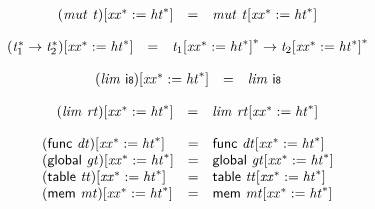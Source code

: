 $$
\begin{array}{@{}lcl@{}l@{}}
{({\mathit{mut}}~{\mathit{t}})}{{}[{{\mathit{xx}}^\ast} := {{\mathit{ht}}^\ast}]} &=& {\mathit{mut}}~{{\mathit{t}}}{{}[{{\mathit{xx}}^\ast} := {{\mathit{ht}}^\ast}]} &  \\
\end{array}
$$

$$
\begin{array}{@{}lcl@{}l@{}}
{({{\mathit{t}}_{{1}}^\ast} \rightarrow {{\mathit{t}}_{{2}}^\ast})}{{}[{{\mathit{xx}}^\ast} := {{\mathit{ht}}^\ast}]} &=& {{{\mathit{t}}_{{1}}}{{}[{{\mathit{xx}}^\ast} := {{\mathit{ht}}^\ast}]}^\ast} \rightarrow {{{\mathit{t}}_{{2}}}{{}[{{\mathit{xx}}^\ast} := {{\mathit{ht}}^\ast}]}^\ast} &  \\
\end{array}
$$

$$
\begin{array}{@{}lcl@{}l@{}}
{({\mathit{lim}}~\mathsf{i{\scriptstyle8}})}{{}[{{\mathit{xx}}^\ast} := {{\mathit{ht}}^\ast}]} &=& {\mathit{lim}}~\mathsf{i{\scriptstyle8}} &  \\
\end{array}
$$

$$
\begin{array}{@{}lcl@{}l@{}}
{({\mathit{lim}}~{\mathit{rt}})}{{}[{{\mathit{xx}}^\ast} := {{\mathit{ht}}^\ast}]} &=& {\mathit{lim}}~{{\mathit{rt}}}{{}[{{\mathit{xx}}^\ast} := {{\mathit{ht}}^\ast}]} &  \\
\end{array}
$$

$$
\begin{array}{@{}lcl@{}l@{}}
{(\mathsf{func}~{\mathit{dt}})}{{}[{{\mathit{xx}}^\ast} := {{\mathit{ht}}^\ast}]} &=& \mathsf{func}~{{\mathit{dt}}}{{}[{{\mathit{xx}}^\ast} := {{\mathit{ht}}^\ast}]} &  \\
{(\mathsf{global}~{\mathit{gt}})}{{}[{{\mathit{xx}}^\ast} := {{\mathit{ht}}^\ast}]} &=& \mathsf{global}~{{\mathit{gt}}}{{}[{{\mathit{xx}}^\ast} := {{\mathit{ht}}^\ast}]} &  \\
{(\mathsf{table}~{\mathit{tt}})}{{}[{{\mathit{xx}}^\ast} := {{\mathit{ht}}^\ast}]} &=& \mathsf{table}~{{\mathit{tt}}}{{}[{{\mathit{xx}}^\ast} := {{\mathit{ht}}^\ast}]} &  \\
{(\mathsf{mem}~{\mathit{mt}})}{{}[{{\mathit{xx}}^\ast} := {{\mathit{ht}}^\ast}]} &=& \mathsf{mem}~{{\mathit{mt}}}{{}[{{\mathit{xx}}^\ast} := {{\mathit{ht}}^\ast}]} &  \\
\end{array}
$$

